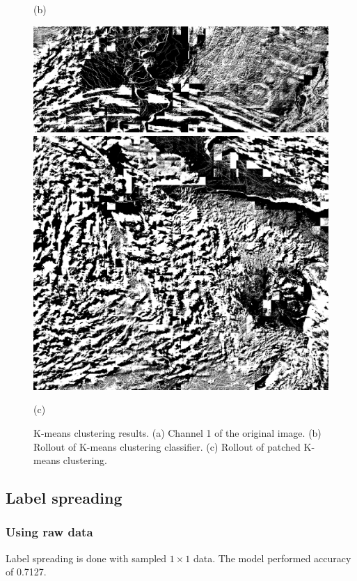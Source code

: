 \documentclass{article}
\begin{document}
\begin{figure}[ht]
\begin{minipage}{0.32\hsize}
                \caption*{(b)}
            \end{minipage}
            \begin{minipage}{0.32\hsize}
                \centering
                \includegraphics[width = 1\hsize]{1_kmeans_patched.png}
                \includegraphics[width = 1\hsize]{2_kmeans_patched.png}
                \caption*{(c)}
            \end{minipage}
            \caption{
                K-means clustering results.
                (a) Channel 1 of the original image.
                (b) Rollout of K-means clustering classifier.
                (c) Rollout of patched K-means clustering.
            }
            \label{fig:kmeans}
        \end{figure}

    \subsection{Label spreading} \label{sec:label}
        \subsubsection{Using raw data}
            Label spreading is done with sampled $1\times 1$ data.
            The model performed accuracy of 0.7127.
\end{document}
